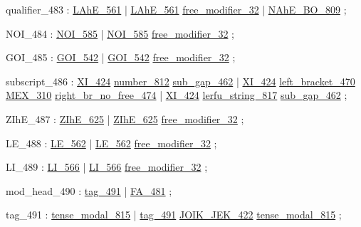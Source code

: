 \label{html:y483}
qualifier_483           :  \hyperref[html:y561]{LAhE_561}
                        |  \hyperref[html:y561]{LAhE_561}  \hyperref[html:y32]{free_modifier_32}
                        |  \hyperref[html:y809]{NAhE_BO_809}
                        ;

\label{html:y484}
NOI_484                 :  \hyperref[html:y585]{NOI_585}
                        |  \hyperref[html:y585]{NOI_585}  \hyperref[html:y32]{free_modifier_32}
                        ;

\label{html:y485}
GOI_485                 :  \hyperref[html:y542]{GOI_542}
                        |  \hyperref[html:y542]{GOI_542}  \hyperref[html:y32]{free_modifier_32}
                        ;

\label{html:y486}
subscript_486           :  \hyperref[html:y424]{XI_424}  \hyperref[html:y812]{number_812}  \hyperref[html:y462]{sub_gap_462}
                        |  \hyperref[html:y424]{XI_424}  \hyperref[html:y470]{left_bracket_470}  \hyperref[html:y310]{MEX_310}
                                \hyperref[html:y474]{right_br_no_free_474}
                        |  \hyperref[html:y424]{XI_424}  \hyperref[html:y817]{lerfu_string_817}  \hyperref[html:y462]{sub_gap_462}
                        ;

\label{html:y487}
ZIhE_487                :  \hyperref[html:y625]{ZIhE_625}
                        |  \hyperref[html:y625]{ZIhE_625}  \hyperref[html:y32]{free_modifier_32}
                        ;

\label{html:y488}
LE_488                  :  \hyperref[html:y562]{LE_562}
                        |  \hyperref[html:y562]{LE_562}  \hyperref[html:y32]{free_modifier_32}
                        ;

\label{html:y489}
LI_489                  :  \hyperref[html:y566]{LI_566}
                        |  \hyperref[html:y566]{LI_566}  \hyperref[html:y32]{free_modifier_32}
                        ;

\label{html:y490}
mod_head_490            :  \hyperref[html:y491]{tag_491}
                        |  \hyperref[html:y481]{FA_481}
                        ;

\label{html:y491}
tag_491                 :  \hyperref[html:y815]{tense_modal_815}
                        |  \hyperref[html:y491]{tag_491}  \hyperref[html:y422]{JOIK_JEK_422}  \hyperref[html:y815]{tense_modal_815}
                        ;

